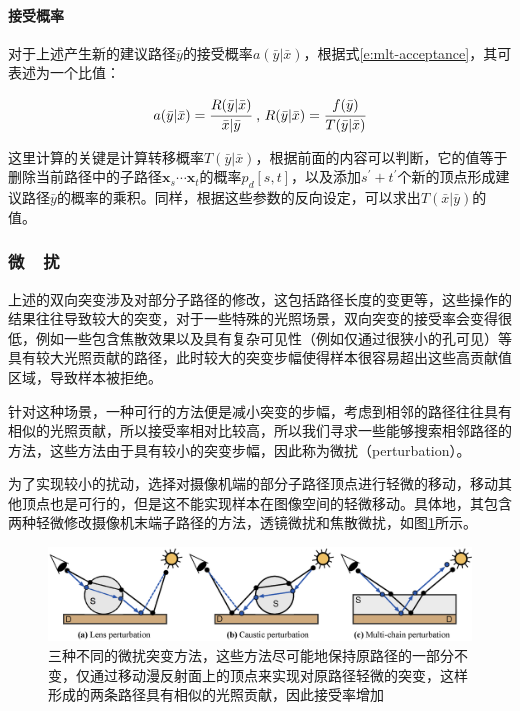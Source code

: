 \paragraph{接受概率}
对于上述产生新的建议路径$\bar{y}$的接受概率$a(\bar{y}|\bar{x})$，根据式\ref{e:mlt-acceptance}，其可表述为一个比值：

\begin{equation}
	a(\bar{y}|\bar{x})= \cfrac{R(\bar{y}|\bar{x})}{\bar{x}|\bar{y}}\text{ , } R(\bar{y}|\bar{x})= \cfrac{f(\bar{y})}{T(\bar{y}|\bar{x})}
\end{equation}

\noindent 这里计算的关键是计算转移概率$T(\bar{y}|\bar{x})$，根据前面的内容可以判断，它的值等于删除当前路径中的子路径$\mathbf{x}_s\cdots\mathbf{x}_t$的概率$p_d[s,t]$，以及添加$s^{'}+t^{'}$个新的顶点形成建议路径$\bar{y}$的概率的乘积。同样，根据这些参数的反向设定，可以求出$T(\bar{x}|\bar{y})$的值。



\subsubsection{微~~扰}
上述的双向突变涉及对部分子路径的修改，这包括路径长度的变更等，这些操作的结果往往导致较大的突变，对于一些特殊的光照场景，双向突变的接受率会变得很低，例如一些包含焦散效果以及具有复杂可见性（例如仅通过很狭小的孔可见）等具有较大光照贡献的路径，此时较大的突变步幅使得样本很容易超出这些高贡献值区域，导致样本被拒绝。

针对这种场景，一种可行的方法便是减小突变的步幅，考虑到相邻的路径往往具有相似的光照贡献，所以接受率相对比较高，所以我们寻求一些能够搜索相邻路径的方法，这些方法由于具有较小的突变步幅，因此称为微扰（perturbation）。

为了实现较小的扰动，\cite{a:MetropolisLightTransport}选择对摄像机端的部分子路径顶点进行轻微的移动，移动其他顶点也是可行的，但是这不能实现样本在图像空间的轻微移动。具体地，其包含两种轻微修改摄像机末端子路径的方法，透镜微扰和焦散微扰，如图\ref{f:mlt-mutations}所示。

\begin{figure}
\begin{fullwidth}
	\includegraphics[width=1.0\thewidth]{figures/mlt/mutations}
	\caption{三种不同的微扰突变方法，这些方法尽可能地保持原路径的一部分不变，仅通过移动漫反射面上的顶点来实现对原路径轻微的突变，这样形成的两条路径具有相似的光照贡献，因此接受率增加}
	\label{f:mlt-mutations}
\end{fullwidth}
\end{figure}



